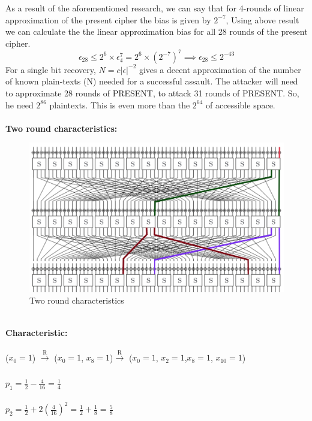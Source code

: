 \documentclass[journal=tosc,preprint]{iacrtrans}
\begin{document}
As a result of the aforementioned research, we can say that for 4-rounds of linear approximation of the present cipher the bias is given by $2^{-7}$,
Using above result we can calculate the the linear approximation bias for all 28 rounds of the present cipher.
 \begin{equation*}
\epsilon_{28} \leq 2^{6} \times \epsilon_4^{7} = 2^6 \times (2^{-7})^7 \implies \epsilon_{28} \leq 2^{-43}
\end{equation*}
For a single bit recovery, $N = c|\epsilon|^{-2}$ gives a decent approximation of the number of known plain-texts (N) needed for a successful assault.
The attacker will need to approximate 28 rounds of PRESENT, to attack 31 rounds of PRESENT. So, he need $2^{86}$ plaintexts. This is even more than the $2^{64}$ of accessible space. \\\\
\textbf{Two round characteristics:}
\begin{figure}[h!]
	\centering
	\includegraphics[width=1.0\linewidth, height=0.32\textheight]{LC2}
	\caption{Two round characteristics}
	\label{fig:lc2}
\end{figure}\\
\textbf{Characteristic:}\\\\
	($x_0 = 1$) $\xrightarrow[]{\text{R}}$ ($x_0 = 1$, $x_8 = 1$)$\xrightarrow[]{\text{R}}$ ($x_0 = 1$, $x_2 = 1$,$x_8 = 1$, $x_{10} = 1$)\\\\
	$p_1= \frac{1}{2}-\frac{4}{16}=\frac{1}{4}$\\\\
	$p_2=\frac{1}{2}+2(\frac{4}{16})^2=\frac{1}{2}+\frac{1}{8}=\frac{5}{8}$\\\\\\
\end{document}
